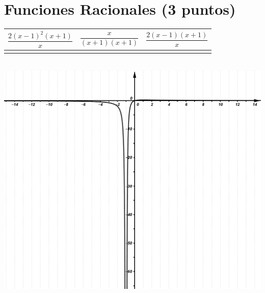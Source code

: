 \documentclass[a4paper,11pt,spanish,sans]{exam}
\newcommand{\Ts}{\rule{0pt}{2.8ex}}       %
\newcommand{\Bs}{\rule[-1.5ex]{0pt}{0pt}} %
\begin{document}
	\section{Funciones Racionales (3 puntos)}
	\begin{minipage}{0.5\textwidth}
		\centering
		\label{mc2}
		\begin{tabular}{|c|c|c|}
			\hline
			$\dfrac{2(x-1)^2(x+1)}{x}$  & $\dfrac{x}{(x+1)(x+1)}$ & $\dfrac{2(x-1)(x+1)}{x}$ \Ts \Bs   \\ \hline
				&   &      \\ \hline
		\end{tabular}\\
		\centering
		\includegraphics[width= 0.95\linewidth]{2dadic2.png}
	\end{minipage}
\end{document}

